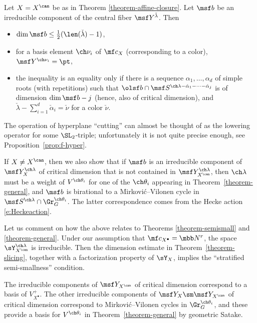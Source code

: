 \begin{thm}
\notready
\label{theorem-slicing}
Let $X = X^\can$ be as in Theorem \ref{theorem-affine-closure}.
 Let $\msf b$ be an irreducible component of the central fiber $\msf Y^{\check\lambda}$. Then
 \begin{itemize}
  \item $\dim \msf b \le \frac{1}{2} (\len(\check\lambda)-1)$,
  \item for a basis element $\ch\nu_i$ of $\mf c_X$ (corresponding to a color), $\msf Y^{\ch\nu_i} = \pt$,
  \item the inequality is an equality only if there is a sequence $\alpha_1,\dots,\alpha_d$ of simple roots (with repetitions) such that $\olsf b \cap \msf S^{\ch\lambda-\check\alpha_1-\cdots-\check\alpha_j}$ is of dimension $\dim \msf b - j$ (hence, also of critical dimension), and $\check\lambda - \sum_{i=1}^d \check\alpha_i = \check\nu$ for a color $\check\nu$.
 \end{itemize}
\end{thm}

The operation of hyperplane ``cutting'' can almost be thought of as the lowering operator
for some $\SL_2$-triple; unfortunately it is not quite precise enough, see Proposition~\ref{prop:f-hyper}.



If $X \ne X^\can$, then we also show that if $\msf b$ is an irreducible component of
$\msf Y^{\ch\lambda}_X$ of critical dimension that is not contained in $\msf Y^{\ch\lambda}_{X^\can}$, then
$\ch\lambda$ must be a weight of $V^{\ch\theta_i}$ for one of the $\ch\theta_i$ appearing in
Theorem~\ref{theorem-general}, and $\msf b$ is birational to a Mirkovi\'c--Vilonen cycle in
$\msf S^{\ch\lambda} \cap \Gr_G^{\ch\theta_i}$. The latter correspondence comes from the Hecke action \eqref{e:Heckeaction}.




Let us comment on how the above relates to Theorems \ref{theorem-semismall} and \ref{theorem-general}.
Under our assumption that $\mf c_{X^\bullet} = \mbb N^r$, the space $\sY^{\ch\lambda}_{X^\can}$
is irreducible.
Then the dimension estimate in Theorem~\ref{theorem-slicing}, together with a factorization property
of $\sY_X$, implies the ``stratified semi-smallness'' condition.

The irreducible components of $\msf Y_{X^\can}$ of critical dimension
correspond to a basis of $V^+_{X^\bullet}$. The other irreducible components of $\msf Y_X \sm \msf Y_{X^\can}$
of critical dimension correspond to Mirkovi\'c--Vilonen cycles in $\Gr_G^{\ch\theta_i}$, and
these provide a basis for $V^{\ch\theta_i}$ in Theorem~\ref{theorem-general} by geometric Satake.

